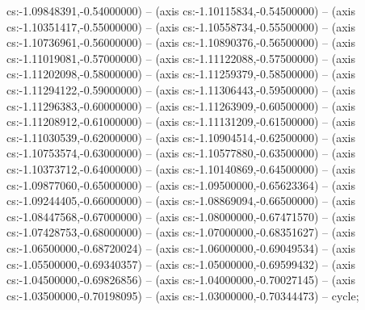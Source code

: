 cs:-1.09848391,-0.54000000) -- (axis cs:-1.10115834,-0.54500000) -- (axis cs:-1.10351417,-0.55000000) -- (axis cs:-1.10558734,-0.55500000) -- (axis cs:-1.10736961,-0.56000000) -- (axis cs:-1.10890376,-0.56500000) -- (axis cs:-1.11019081,-0.57000000) -- (axis cs:-1.11122088,-0.57500000) -- (axis cs:-1.11202098,-0.58000000) -- (axis cs:-1.11259379,-0.58500000) -- (axis cs:-1.11294122,-0.59000000) -- (axis cs:-1.11306443,-0.59500000) -- (axis cs:-1.11296383,-0.60000000) -- (axis cs:-1.11263909,-0.60500000) -- (axis cs:-1.11208912,-0.61000000) -- (axis cs:-1.11131209,-0.61500000) -- (axis cs:-1.11030539,-0.62000000) -- (axis cs:-1.10904514,-0.62500000) -- (axis cs:-1.10753574,-0.63000000) -- (axis cs:-1.10577880,-0.63500000) -- (axis cs:-1.10373712,-0.64000000) -- (axis cs:-1.10140869,-0.64500000) -- (axis cs:-1.09877060,-0.65000000) -- (axis cs:-1.09500000,-0.65623364) -- (axis cs:-1.09244405,-0.66000000) -- (axis cs:-1.08869094,-0.66500000) -- (axis cs:-1.08447568,-0.67000000) -- (axis cs:-1.08000000,-0.67471570) -- (axis cs:-1.07428753,-0.68000000) -- (axis cs:-1.07000000,-0.68351627) -- (axis cs:-1.06500000,-0.68720024) -- (axis cs:-1.06000000,-0.69049534) -- (axis cs:-1.05500000,-0.69340357) -- (axis cs:-1.05000000,-0.69599432) -- (axis cs:-1.04500000,-0.69826856) -- (axis cs:-1.04000000,-0.70027145) -- (axis cs:-1.03500000,-0.70198095) -- (axis cs:-1.03000000,-0.70344473) -- cycle;
